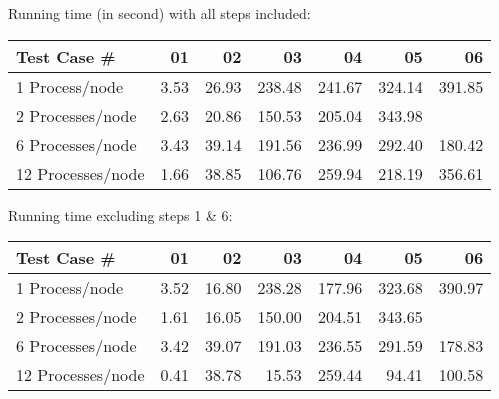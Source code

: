 \documentclass{article}
\begin{document}
Running time (in second) with all steps included:

\begin{center}
  \begin{tabular}{| l | r | r | r | r | r | r |}
    \hline
    Test Case \# & 01 & 02 & 03 & 04 & 05 & 06  \\ \hline
    1 Process/node & 3.53 & 26.93 & 238.48 & 241.67 & 324.14 & 391.85 \\ \hline
    2 Processes/node & 2.63 & 20.86 & 150.53 & 205.04 & 343.98 &  \\ \hline
    6 Processes/node & 3.43 & 39.14 & 191.56 & 236.99 & 292.40 & 180.42 \\ \hline
    12 Processes/node & 1.66 & 38.85 & 106.76 & 259.94 & 218.19 & 356.61 \\ \hline
  \end{tabular}
\end{center}


Running time excluding steps 1 \& 6:

\begin{center}
  \begin{tabular}{| l | r | r | r | r | r | r |}
    \hline
    Test Case \# & 01 & 02 & 03 & 04 & 05 & 06  \\ \hline
    1 Process/node & 3.52 & 16.80 & 238.28 & 177.96 & 323.68 & 390.97 \\ \hline
    2 Processes/node & 1.61 & 16.05 & 150.00 & 204.51 & 343.65 &  \\ \hline
    6 Processes/node & 3.42 & 39.07 & 191.03 & 236.55 & 291.59 & 178.83 \\ \hline
    12 Processes/node & 0.41 & 38.78 & 15.53 & 259.44 & 94.41 & 100.58 \\ \hline
  \end{tabular}
\end{center}
\end{document}
